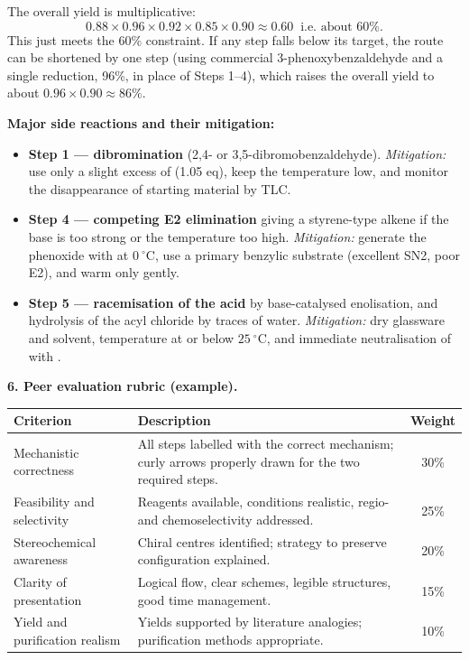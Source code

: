 \documentclass[11pt]{article}
\newcommand{\cle}[1]{{\popxbold\color{popdark}#1}}
\begin{document}
The overall yield is multiplicative:
\[ 0.88 \times 0.96 \times 0.92 \times 0.85 \times 0.90 \approx 0.60 \;\; \text{i.e. about } 60\%. \]
This just meets the 60\% constraint. If any step falls below its target, the route can be shortened by one step (using commercial 3-phenoxybenzaldehyde and a single  reduction, 96\%, in place of Steps 1--4), which raises the overall yield to about $0.96 \times 0.90 \approx 86\%$.

\textbf{Major side reactions and their mitigation:}
\begin{itemize}
    \item \textbf{Step 1 --- dibromination} (2,4- or 3,5-dibromobenzaldehyde). \emph{Mitigation:} use only a slight excess of  (1.05 eq), keep the temperature low, and monitor the disappearance of starting material by TLC.
    \item \textbf{Step 4 --- competing \cle{E2} elimination} giving a styrene-type alkene if the base is too strong or the temperature too high. \emph{Mitigation:} generate the phenoxide with  at $0\ ^{\circ}\mathrm{C}$, use a primary benzylic substrate (excellent \cle{SN2}, poor \cle{E2}), and warm only gently.
    \item \textbf{Step 5 --- racemisation of the acid} by base-catalysed enolisation, and hydrolysis of the acyl chloride by traces of water. \emph{Mitigation:} dry glassware and solvent, temperature at or below $25\ ^{\circ}\mathrm{C}$, and immediate neutralisation of  with .
\end{itemize}

\textbf{6. Peer evaluation rubric (example).}
\begin{center}
\begin{tabularx}{\linewidth}{|l|X|c|}\hline
\rowcolor{popblueL}
\textbf{Criterion} & \textbf{Description} & \textbf{Weight} \\ \hline
Mechanistic correctness & All steps labelled with the correct mechanism; curly arrows properly drawn for the two required steps. & 30\% \\ \hline
Feasibility and selectivity & Reagents available, conditions realistic, regio- and chemoselectivity addressed. & 25\% \\ \hline
Stereochemical awareness & Chiral centres identified; strategy to preserve configuration explained. & 20\% \\ \hline
Clarity of presentation & Logical flow, clear schemes, legible structures, good time management. & 15\% \\ \hline
Yield and purification realism & Yields supported by literature analogies; purification methods appropriate. & 10\% \\ \hline
\end{tabularx}
\end{center}
\end{document}
